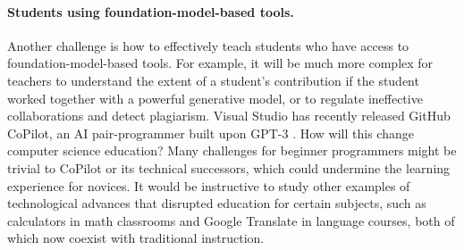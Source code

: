 \paragraph{Students using foundation-model-based tools.} Another challenge is how to effectively teach students who have access to foundation-model-based tools. For example, it will be much more complex for teachers to understand the extent of a student's contribution if the student worked together with a powerful generative model, or to regulate ineffective collaborations and detect plagiarism. Visual Studio has recently released GitHub CoPilot, an AI pair-programmer built upon GPT-3 \cite{chen2021evaluating}. How will this change computer science education? Many challenges for beginner programmers might be trivial to CoPilot or its technical successors, which could undermine the learning experience for novices. It would be instructive to study other examples of technological advances that disrupted education for certain subjects, such as calculators in math classrooms and Google Translate in language courses, both of which now coexist with traditional instruction.





